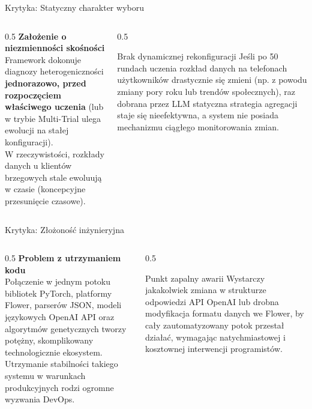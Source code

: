 \documentclass[9pt,aspectratio=169]{beamer}
\begin{document}
\begin{frame}{Krytyka: Statyczny charakter wyboru}
\begin{columns}[T]
\begin{column}{0.5\textwidth}
\textbf{Założenie o niezmienności skośności}\\[4pt]
Framework dokonuje diagnozy heterogeniczności \textbf{jednorazowo, przed rozpoczęciem właściwego uczenia} (lub w trybie Multi-Trial ulega ewolucji na stałej konfiguracji).\\[6pt]
W rzeczywistości, rozkłady danych u klientów brzegowych stale ewoluują w czasie (koncepcyjne przesunięcie czasowe).
\end{column}
\begin{column}{0.5\textwidth}
\begin{infoboxorange}{Brak dynamicznej rekonfiguracji}
Jeśli po 50 rundach uczenia rozkład danych na telefonach użytkowników drastycznie się zmieni (np. z powodu zmiany pory roku lub trendów społecznych), raz dobrana przez LLM statyczna strategia agregacji staje się nieefektywna, a system nie posiada mechanizmu ciągłego monitorowania zmian.
\end{infoboxorange}
\end{column}
\end{columns}
\end{frame}

\begin{frame}{Krytyka: Złożoność inżynieryjna}
\begin{columns}[T]
\begin{column}{0.5\textwidth}
\textbf{Problem z utrzymaniem kodu}\\[4pt]
Połączenie w jednym potoku bibliotek PyTorch, platformy Flower, parserów JSON, modeli językowych OpenAI API oraz algorytmów genetycznych tworzy potężny, skomplikowany technologicznie ekosystem.\\[6pt]
Utrzymanie stabilności takiego systemu w warunkach produkcyjnych rodzi ogromne wyzwania DevOps.
\end{column}
\begin{column}{0.5\textwidth}
\begin{infoboxorange}{Punkt zapalny awarii}
Wystarczy jakakolwiek zmiana w strukturze odpowiedzi API OpenAI lub drobna modyfikacja formatu danych we Flower, by cały zautomatyzowany potok przestał działać, wymagając natychmiastowej i kosztownej interwencji programistów.
\end{infoboxorange}
\end{column}
\end{columns}
\end{frame}
\end{document}
